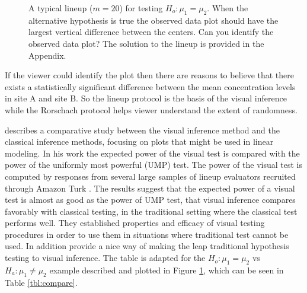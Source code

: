 \documentclass[12]{article}
\begin{document}
\begin{figure}[hbtp]
   \centering
      \caption{A typical lineup  ($m = 20$) for testing $H_o: \mu_1 =  \mu_2$. 
      When the alternative hypothesis is true the observed data plot should have the largest vertical difference between the centers. Can you identify the observed data plot? The solution to the lineup is provided in the Appendix.}
      \label{lineup}
\end{figure}


If the viewer could identify the plot then there are reasons to believe that there exists a statistically significant difference between the mean concentration levels in site A and site B. So the lineup protocol is the basis of the visual inference while the Rorschach protocol helps viewer understand the extent of randomness. 

\cite{majumder:2011} describes a comparative study between the visual inference method and the classical inference methods, focusing on plots that might be used in linear modeling. In his work the expected power of the visual test is compared with the power of the uniformly most powerful (UMP) test. The power of the visual test is computed by responses from several large samples of lineup evaluators recruited through Amazon Turk \citep{turk}. The results suggest that the expected power of a visual test is almost as good as the power of UMP test, that visual inference compares favorably with classical testing, in the traditional setting where the classical test performs well. They established properties and efficacy of visual testing procedures in order to use them in situations where traditional test cannot be used. In addition \cite{majumder:2011} provide a nice way of making the leap traditional hypothesis testing to visual inference. The table is adapted for the $H_o: \mu_1 =  \mu_2$ vs $H_a: \mu_1 \ne \mu_2$ example described and plotted in Figure \ref{lineup}, which can be seen in Table \ref{tbl:compare}.
\end{document}
